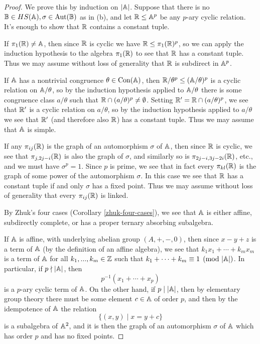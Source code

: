 \documentclass[letterpaper,11pt]{article}
\DeclareMathOperator{\Aut}{Aut}
\DeclareMathOperator{\Con}{Con}
\begin{document}
\begin{proof} We prove this by induction on $|\mathbb{A}|$. Suppose that there is no $\bB \in HS(\bA), \sigma \in \Aut(\bB)$ as in (b), and let $\mathbb{R} \le \mathbb{A}^p$ be any $p$-ary cyclic relation. It's enough to show that $\mathbb{R}$ contains a constant tuple.

If $\pi_1(\mathbb{R}) \ne \mathbb{A}$, then since $\mathbb{R}$ is cyclic we have $\mathbb{R} \le \pi_1(\mathbb{R})^p$, so we can apply the induction hypothesis to the algebra $\pi_1(\mathbb{R})$ to see that $\mathbb{R}$ has a constant tuple. Thus we may assume without loss of generality that $\mathbb{R}$ is subdirect in $\mathbb{A}^p$.

If $\mathbb{A}$ has a nontrivial congruence $\theta \in \Con(\bA)$, then $\mathbb{R}/\theta^p \le (\mathbb{A}/\theta)^p$ is a cyclic relation on $\mathbb{A}/\theta$, so by the induction hypothesis applied to $\mathbb{A}/\theta$ there is some congruence class $a/\theta$ such that $\mathbb{R} \cap (a/\theta)^p \ne \emptyset$. Setting $\mathbb{R}' = \mathbb{R} \cap (a/\theta)^p$, we see that $\mathbb{R}'$ is a cyclic relation on $a/\theta$, so by the induction hypothesis applied to $a/\theta$ we see that $\mathbb{R}'$ (and therefore also $\mathbb{R}$) has a constant tuple. Thus we may assume that $\mathbb{A}$ is simple.

If any $\pi_{ij}(\mathbb{R})$ is the graph of an automorphism $\sigma$ of $\mathbb{A}$, then since $\mathbb{R}$ is cyclic, we see that $\pi_{j,2j-i}(\mathbb{R})$ is also the graph of $\sigma$, and similarly so is $\pi_{2j-i,3j-2i}(\mathbb{R})$, etc., and we must have $\sigma^p = 1$. Since $p$ is prime, we see that in fact every $\pi_{kl}(\mathbb{R})$ is the graph of some power of the automorphism $\sigma$. In this case we see that $\mathbb{R}$ has a constant tuple if and only $\sigma$ has a fixed point. Thus we may assume without loss of generality that every $\pi_{ij}(\mathbb{R})$ is linked.

By Zhuk's four cases (Corollary \ref{zhuk-four-cases}), we see that $\mathbb{A}$ is either affine, subdirectly complete, or has a proper ternary absorbing subalgebra.

If $\mathbb{A}$ is affine, with underlying abelian group $(A, +, -, 0)$, then since $x-y+z$ is a term of $\mathbb{A}$ (by the definition of an affine algebra), we see that $k_1x_1 + \cdots + k_mx_m$ is a term of $\mathbb{A}$ for all $k_1, ..., k_m \in \mathbb{Z}$ such that $k_1 + \cdots + k_m \equiv 1 \pmod{|\mathbb{A}|}$. In particular, if $p \nmid |\mathbb{A}|$, then
\[
p^{-1}(x_1 + \cdots + x_p)
\]
is a $p$-ary cyclic term of $\mathbb{A}$. On the other hand, if $p \mid |\mathbb{A}|$, then by elementary group theory there must be some element $c \in \mathbb{A}$ of order $p$, and then by the idempotence of $\mathbb{A}$ the relation
\[
\{(x,y) \mid x = y + c\}
\]
is a subalgebra of $\mathbb{A}^2$, and it is then the graph of an automorphism $\sigma$ of $\mathbb{A}$ which has order $p$ and has no fixed points.


\end{proof}
\end{document}
